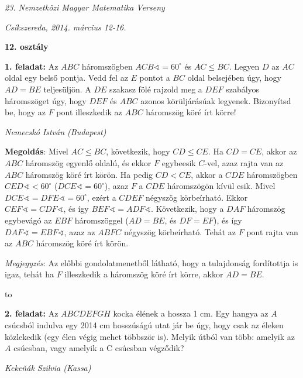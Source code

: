 \documentclass[a4paper,10pt]{article}
\newcommand{\ki}[2]{\hfill {\it #1 (#2)}\medskip}
\newcommand{\vonal}{\hbox to \hsize{\hskip2truecm\hrulefill\hskip2truecm}}
\begin{document}
\begin{center} \Large {\em 23. Nemzetközi Magyar Matematika Verseny} \end{center}
\begin{center} \large{\em Csíkszereda, 2014. március 12-16.} \end{center}
\smallskip
\begin{center} \large{\bf 12. osztály} \end{center}
\bigskip

{\bf 1. feladat: } Az $ABC$ háromszögben $ACB\sphericalangle = 60^\circ$ és $AC\le
BC$. Legyen $D$ az $AC$ oldal egy belső pontja. Vedd fel az $E$
pontot a $BC$ oldal belsejében úgy, hogy $AD = BE$
teljesüljön. A $DE$ szakasz fölé rajzold meg a $DEF$
szabályos háromszöget úgy, hogy $DEF$ és $ABC$ azonos
körüljárásúak legyenek. Bizonyítsd be, hogy az $F$ pont
illeszkedik az $ABC$ háromszög köré írt körre!


\ki{Nemecskó István}{Budapest}\medskip

{\bf Megoldás}: Mivel $AC\leq BC$, következik, hogy $CD\leq CE$.
 Ha $CD=CE$, akkor az $ABC$ háromszög egyenlő
oldalú, és ekkor $F$ egybeesik $C$-vel, azaz rajta van az
$ABC$ háromszög köré írt körön. Ha
pedig $CD<CE$, akkor a $CDE$ háromszögben $
{CED}\sphericalangle<60^{\circ}$  (${DCE}\sphericalangle=60^{\circ}$), azaz $F$
a $CDE$ háromszögön kívül esik. \newline Mivel
${DCE}\sphericalangle ={DFE}\sphericalangle=60^{\circ}$, ezért a $CDEF$
négyszög körbeírható. Ekkor
${CEF}\sphericalangle={CDF}\sphericalangle$, és így
${BEF}\sphericalangle={ADF}\sphericalangle$. Következik, hogy a $DAF$
háromszög egybevágó az $EBF$ háromszöggel
($AD=BE$, és $DF=EF$), és így
${DAF}\sphericalangle={EBF}\sphericalangle$, azaz az $ABFC$ négyszög
körbeírható. Tehát az $F$ pont rajta van az $ABC$
háromszög köré írt körön.

\medskip

\textit{Megjegyzés}:  Az előbbi gondolatmenetből látható, hogy a
tulajdonság fordítottja is igaz, tehát ha $F$ illeszkedik a
háromszög köré írt körre, akkor $AD=BE.$

\medskip
\vonal

{\bf 2. feladat: } Az $ABCDEFGH$ kocka élének a hossza 1 cm. Egy hangya az $A$
csúcsból indulva egy 2014 cm hosszúságú utat jár be
úgy, hogy csak az éleken közlekedik (egy élen végig mehet
többször is). Melyik útból van több: amelyik az $A$
csúcsban, vagy amelyik a C csúcsban végződik?


\ki{Keke\v{n}ák Szilvia}{Kassa}\medskip
\end{document}
